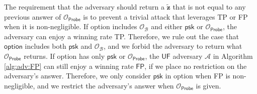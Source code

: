 The requirement that the adversary should return a $\mathbf{\tilde{z}}$ that is not equal to any previous answer of $\mathcal{O}_\textsf{Probe}$ is to prevent a trivial attack that leverages \textsf{TP} or \textsf{FP} when it is non-negligible. If \textsf{option} includes $\mathcal{O}_\mathcal{B}$ and either $\textsf{psk}$ or $\mathcal{O}_\textsf{Probe}$, the adversary can enjoy a winning rate \textsf{TP}. Therefore, we rule out the case that $\textsf{option}$ includes both $\textsf{psk}$ and $\mathcal{O}_\mathcal{B}$, and we forbid the adversary to return what $\mathcal{O}_\textsf{Probe}$ returns.
If \textsf{option} has only $\textsf{psk}$ or $\mathcal{O}_\textsf{Probe}$, the $\textsf{UF}$ adversary $\mathcal{A}$ in Algorithm \ref{alg:adv:FP} can still enjoy a winning rate $\textsf{FP}$, if we place no restriction on the adversary's answer. Therefore, we only consider $\textsf{psk}$ in \textsf{option} when \textsf{FP} is non-negligible, and we restrict the adversary's answer when $\mathcal{O}_\textsf{Probe}$ is given.


 

